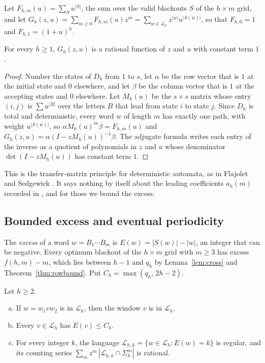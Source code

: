 Let $F_{h,m}(u)=\sum_Su^{|S|}$, the sum over the valid blackouts $S$ of the $h\times m$ grid, and let $G_h(z,u)=\sum_{m\ge0}F_{h,m}(u)z^m=\sum_{w\in\mathcal L_h}z^{|w|}u^{|S(w)|}$, so that $F_{h,0}=1$ and $F_{h,1}=(1+u)^h$.

\begin{theorem}\label{thm:rational}
For every $h\ge1$, $G_h(z,u)$ is a rational function of $z$ and $u$ with constant term $1$.
\end{theorem}

\begin{proof}
Number the states of $D_h$ from $1$ to $s$, let $\alpha$ be the row vector that is $1$ at the initial state and $0$ elsewhere, and let $\beta$ be the column vector that is $1$ at the accepting states and $0$ elsewhere. Let $M_h(u)$ be the $s\times s$ matrix whose entry $(i,j)$ is $\sum u^{|B|}$ over the letters $B$ that lead from state $i$ to state $j$. Since $D_h$ is total and deterministic, every word $w$ of length $m$ has exactly one path, with weight $u^{|S(w)|}$, so $\alpha M_h(u)^m\beta=F_{h,m}(u)$ and $G_h(z,u)=\alpha(I-zM_h(u))^{-1}\beta$. The adjugate formula writes each entry of the inverse as a quotient of polynomials in $z$ and $u$ whose denominator $\det(I-zM_h(u))$ has constant term $1$.
\end{proof}

This is the transfer-matrix principle for deterministic automata, as in Flajolet and Sedgewick \cite[Proposition~I.3]{flajolet2009}. It says nothing by itself about the leading coefficients $a_h(m)$ recorded in , and for those we bound the excess.

\subsection{Bounded excess and eventual periodicity}

The \emph{excess} of a word $w=B_1\cdots B_m$ is $E(w)=|S(w)|-|w|$, an integer that can be negative. Every optimum blackout of the $h\times m$ grid with $m\ge3$ has excess $f(h,m)-m$, which lies between $h-1$ and $q_h$ by Lemma~\ref{lem:cross} and Theorem~\ref{thm:rowbound}. Put $C_h=\max(q_h,\,2h-2)$.

\begin{lemma}\label{lem:excess}
Let $h\ge2$.
\begin{enumerate}[(a)]
\item If $w=w_1vw_2$ is in $\mathcal L_h$, then the window $v$ is in $\mathcal L_h$.
\item Every $v\in\mathcal L_h$ has $E(v)\le C_h$.
\item For every integer $k$, the language $\mathcal L_{h,k}=\{w\in\mathcal L_h:E(w)=k\}$ is regular, and its counting series $\sum_mz^m\,|\mathcal L_{h,k}\cap\Sigma_h^m|$ is rational.
\end{enumerate}
\end{lemma}

